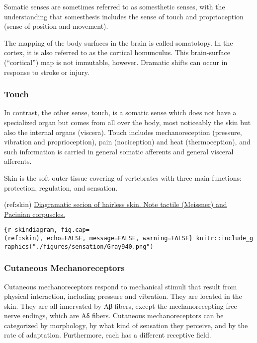 Somatic senses are sometimes referred to as somesthetic senses, with the
understanding that somesthesis includes the sense of touch and
proprioception (sense of position and movement).

The mapping of the body surfaces in the brain is called somatotopy. In
the cortex, it is also referred to as the cortical homunculus. This
brain-surface (``cortical'') map is not immutable, however. Dramatic
shifts can occur in response to stroke or injury.

\hypertarget{touch}{%
\subsubsection{Touch}\label{touch}}

In contrast, the other sense, touch, is a somatic sense which does not
have a specialized organ but comes from all over the body, most
noticeably the skin but also the internal organs (viscera). Touch
includes mechanoreception (pressure, vibration and proprioception), pain
(nociception) and heat (thermoception), and such information is carried
in general somatic afferents and general visceral afferents.

Skin is the soft outer tissue covering of vertebrates with three main
functions: protection, regulation, and sensation.

(ref:skin)
\href{https://commons.wikimedia.org/wiki/File:Gray940.png}{Diagramatic
secion of hairless skin. Note tactile (Meissner) and Pacinian
corpuscles.}

\texttt{\{r\ skindiagram,\ fig.cap=\textquotesingle{}(ref:skin)\textquotesingle{},\ echo=FALSE,\ message=FALSE,\ warning=FALSE\}\ knitr::include\_graphics("./figures/sensation/Gray940.png")}

\hypertarget{cutaneous-mechanoreceptors}{%
\subsubsection{Cutaneous
Mechanoreceptors}\label{cutaneous-mechanoreceptors}}

Cutaneous mechanoreceptors respond to mechanical stimuli that result
from physical interaction, including pressure and vibration. They are
located in the skin. They are all innervated by Aβ fibers, except the
mechanorecepting free nerve endings, which are Aδ fibers. Cutaneous
mechanoreceptors can be categorized by morphology, by what kind of
sensation they perceive, and by the rate of adaptation. Furthermore,
each has a different receptive field.

